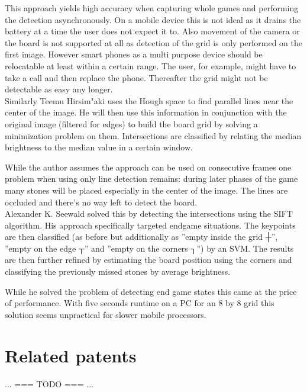 	This approach yields high accuracy when capturing whole games and performing the detection asynchronously. On a mobile device this is not ideal as it drains the battery at a time the user does not expect it to. Also movement of the camera or the board is not supported at all as detection of the grid is only performed on the first image. However smart phones as a multi purpose device should be relocatable at least within a certain range. The user, for example, might have to take a call and then replace the phone. Thereafter the grid might not be detectable as easy any longer.
	\\

	Similarly Teemu Hirsim"aki \cite{hirsimaki2005extracting} uses the Hough space to find parallel lines near the center of the image. He will then use this information in conjunction with the original image (filtered for edges) to build the board grid by solving a minimization problem on them. Intersections are classified by relating the median brightness to the median value in a certain window.

	While the author assumes the approach can be used on consecutive frames one problem when using only line detection remains: during later phases of the game many stones will be placed especially in the center of the image. The lines are occluded and there's no way left to detect the board.
	\\

	Alexander K. Seewald \cite{seewald2010automatic} solved this by detecting the intersections using the SIFT algorithm. His approach specifically targeted endgame situations. The keypoints are then classified (as before but additionally as ''empty inside the grid ┼'', ''empty on the edge ┬'' and ''empty on the corners ┐'') by an SVM. The results are then further refined by estimating the board position using the corners and classifying the previously missed stones by average brightness.

	While he solved the problem of detecting end game states this came at the price of performance. With five seconds runtime on a PC for an 8 by 8 grid this solution seems unpractical for slower mobile processors.

	\section{Related patents}
	\label{introduction-patents}

	... === TODO === ...

